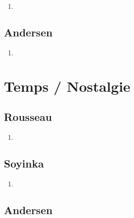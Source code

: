 \documentclass[a4paper, 11pt, hidelinks]{article}
\begin{document}
\begin{enumerate}
    \item 
\end{enumerate}




\subsection{Andersen}


\begin{enumerate}
    \item 
\end{enumerate}




























\section{Temps / Nostalgie}



\subsection{Rousseau}


\begin{enumerate}
    \item 
\end{enumerate}



\subsection{Soyinka}


\begin{enumerate}
    \item 
\end{enumerate}




\subsection{Andersen}
\end{document}
